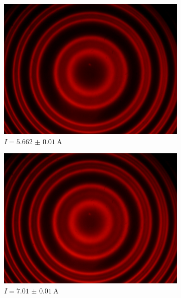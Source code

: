 \begin{figure}[!ht]
		\begin{subfigure}{0.48\textwidth}
			\centering
			\includegraphics[width=\textwidth]{images/Capture_819.bmp.jpg}
			\caption{$I = \SI{5.662(10)}{\ampere}$}
			\label{fig:red_I5.662}
			\vspace{0.5\baselineskip}
		\end{subfigure}
		\hfill
		\begin{subfigure}{0.48\textwidth}
			\centering
			\includegraphics[width=\textwidth]{images/Capture_820.bmp.jpg}
			\caption{$I = \SI{7.01(1)}{\ampere}$}
			\label{fig:red_I7.01}
			\vspace{0.5\baselineskip}
		\end{subfigure}
		\begin{subfigure}{0.48\textwidth}

\end{subfigure}
\end{figure}
